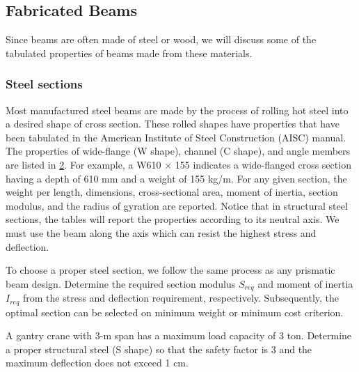 \documentclass[a4paper,openany,nobib]{tufte-book}
\begin{document}
{{\subsection{Fabricated Beams}
\label{fabricated-beams}
Since beams are often made of steel or wood, we will discuss some of the
tabulated properties of beams made from these materials.

\subsubsection{Steel sections}
\label{steel-sections}
Most manufactured steel beams are made by the process of rolling hot
steel into a desired shape of cross section. These rolled shapes have
properties that have been tabulated in the American Institute of Steel
Construction (AISC) manual. The properties of wide-flange (W shape),
channel (C shape), and angle members are listed in
\hyperref[appendix: structural steel properties]{2}. For example, a W610
\(\times\) 155 indicates a wide-flanged cross section having a depth of
610 mm and a weight of 155 kg/m. For any given section, the weight per
length, dimensions, cross-sectional area, moment of inertia, section
modulus, and the radius of gyration are reported. Notice that in
structural steel sections, the tables will report the properties
according to its neutral axis. We must use the beam along the axis which
can resist the highest stress and deflection.


\hspace{1cm}
\hspace{1cm}
\hspace{1cm}
To choose a proper steel section, we follow the same process as any
prismatic beam design. Determine the required section modulus \(S_{req}\)
and moment of inertia \(I_{req}\) from the stress and deflection
requirement, respectively. Subsequently, the optimal section can be
selected on minimum weight or minimum cost criterion.

A gantry crane with 3-m span has a maximum load capacity of 3 ton.
Determine a proper structural steel (S shape) so that the safety factor
is 3 and the maximum deflection does not exceed 1 cm.

}}
\end{document}
